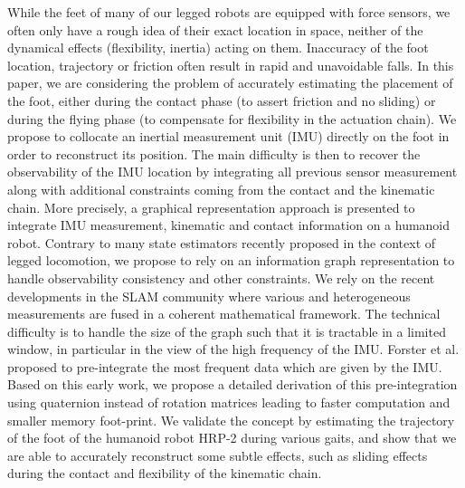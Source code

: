 

While the feet of many of our legged robots are equipped with force sensors, we often only have a rough idea of their exact location in space, neither of the dynamical effects (flexibility, inertia) acting on them.
Inaccuracy of the foot location, trajectory or friction often result in rapid and unavoidable falls.
In this paper, we are considering the problem of accurately estimating the placement of the foot, either during the contact phase (to assert friction and no sliding) or during the flying phase (to compensate for flexibility in the actuation chain).
We propose to collocate an inertial measurement unit (IMU) directly on the foot in order to reconstruct its position.
The main difficulty is then to recover the observability of the IMU location by integrating all previous sensor measurement along with additional constraints coming from the contact and the kinematic chain.
More precisely, a graphical representation approach is presented to integrate IMU measurement, kinematic and contact information on a humanoid robot. 
Contrary to many state estimators recently proposed in the context of legged locomotion, we propose to rely on an information graph representation to handle observability consistency and other constraints.
We rely on the recent developments in the SLAM community where various and heterogeneous measurements are fused in a coherent mathematical framework.
The technical difficulty is to handle the size of the graph such that it is tractable in a limited window, in particular in the view of the high frequency of the IMU.
Forster et al. proposed to pre-integrate the most frequent data which are given by the IMU.
Based on this early work, we propose a detailed derivation of this pre-integration using quaternion instead of rotation matrices leading to faster computation and smaller memory foot-print.
We validate the concept by estimating the trajectory of the foot of the humanoid robot HRP-2 during various gaits, and show that we are able to accurately reconstruct some subtle effects, such as sliding effects during the contact and flexibility of the kinematic chain.
